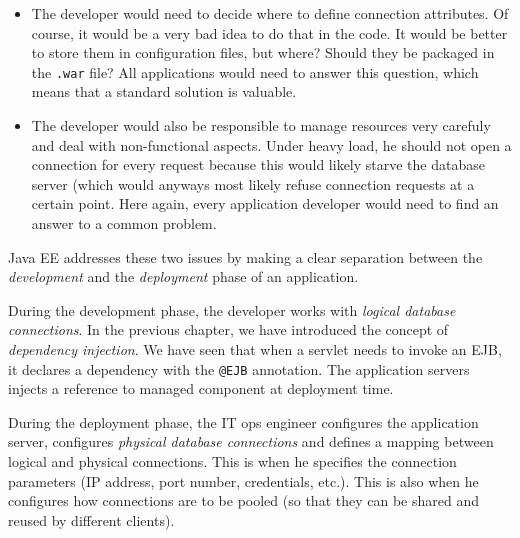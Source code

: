 \begin{itemize}
\item The developer would need to decide where to define connection attributes. Of course, it would be a very bad idea to do that in the code. It would be better to store them in configuration files, but where? Should they be packaged in the \texttt{.war} file? All applications would need to answer this question, which means that a standard solution is valuable.
\item The developer would also be responsible to manage resources very carefuly and deal with non-functional aspects. Under heavy load, he should not open a connection for every request because this would likely starve the database server (which would anyways most likely refuse connection requests at a certain point. Here again, every application developer would need to find an answer to a common problem.
\end{itemize}

Java EE addresses these two issues by making a clear separation between the \emph{development} and the \emph{deployment} phase of an application.


During the development phase, the developer works with \emph{logical database connections}. In the previous chapter, we have introduced the concept of \emph{dependency injection}. We have seen that when a servlet needs to invoke an \ac{EJB}, it declares a dependency with the \texttt{@EJB} annotation. The application servers injects a reference to managed component at deployment time.


During the deployment phase, the IT ops engineer configures the application server, configures \emph{physical database connections} and defines a mapping between logical and physical connections. This is when he specifies the connection parameters (IP address, port number, credentials, etc.). This 
is also when he configures how connections are to be pooled (so that they can be shared and reused by different clients).

